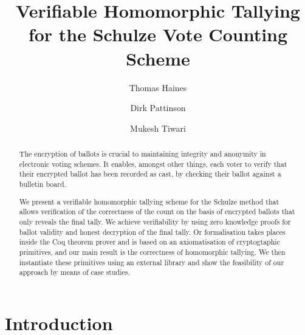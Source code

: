 \documentclass{llncs}
\begin{document}
\title{Verifiable Homomorphic Tallying for the Schulze Vote Counting
Scheme}

\author{Thomas Haines  \and
      Dirk Pattinson \and Mukesh Tiwari }
\maketitle

\begin{abstract}
The encryption of ballots is crucial to maintaining integrity and 
anonymity in electronic voting schemes. It enables, amongst other 
things, each voter to verify that their encrypted ballot has been 
recorded as cast, by checking their ballot against a bulletin board. 

We present a verifiable homomorphic tallying scheme for the Schulze 
method that allows verification of the correctness of the count on the 
basis of encrypted ballots that only reveals the final tally. We 
achieve verifiability by using zero knowledge proofs for ballot 
validity and honest decryption of the final tally. Or formalisation 
takes places inside the Coq theorem prover and is based on an 
axiomatisation of cryptogtaphic primitives, and our main result is 
the correctness of homomorphic tallying. We then instantiate 
these primitives using an external library and show the feasibility 
of our approach by means of case studies.
\end{abstract}


\section{Introduction}
\end{document}
